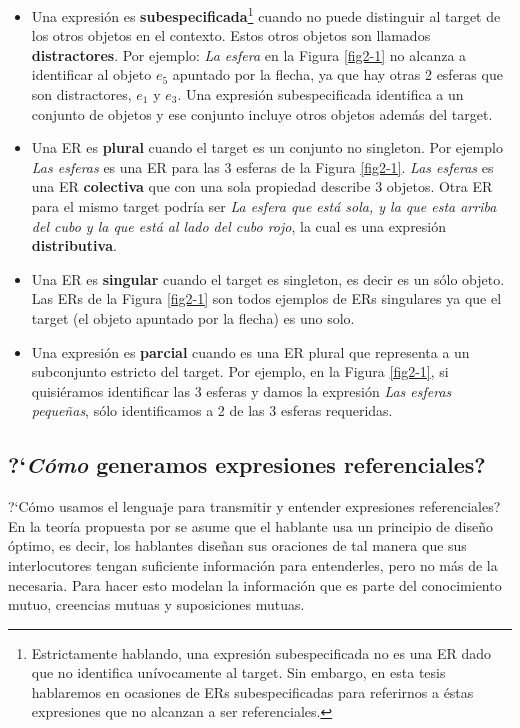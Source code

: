 \begin{itemize}
\item Una expresi\'on es {\bf subespecificada}\footnote{Estrictamente hablando, una expresi\'on subespecificada no es una ER dado que no identifica un\'ivocamente al target. Sin embargo, en esta tesis hablaremos en ocasiones de ERs subespecificadas para referirnos a \'estas expresiones que no alcanzan a ser referenciales.} cuando no puede distinguir al target de los otros objetos en el contexto. Estos otros objetos son llamados \textbf{distractores}. Por ejemplo: {\it La esfera} en la Figura \ref{fig2-1} no alcanza a identificar al objeto $e_5$ apuntado por la flecha, ya que hay otras 2 esferas que son distractores, $e_1$ y $e_3$. Una expresi\'on subespecificada identifica a un conjunto de objetos y ese conjunto incluye otros objetos adem\'as del target.

\item Una ER es {\bf plural} cuando el target es un conjunto no singleton. Por ejemplo {\it Las esferas} es una ER para las 3 esferas de la Figura \ref{fig2-1}. {\it Las esferas} es una ER \textbf{colectiva} que con una sola propiedad describe 3 objetos. Otra ER para el mismo target podr\'ia ser {\it La esfera que est\'a sola, y la que esta arriba del cubo y la que est\'a al lado del cubo rojo}, la cual es una expresi\'on \textbf{distributiva}.

\item Una ER es {\bf singular} cuando el target es singleton, es decir es un s\'olo objeto. Las ERs de la Figura \ref{fig2-1} son todos ejemplos de ERs singulares ya que el target (el objeto apuntado por la flecha) es uno solo. 

\item Una expresi\'on es {\bf parcial} cuando es una ER plural que representa a un subconjunto estricto del target. Por ejemplo, en la Figura \ref{fig2-1}, si quisi\'eramos identificar las 3 esferas y damos la expresi\'on {\it Las esferas peque\~nas}, s\'olo identificamos a 2 de las 3 esferas requeridas.
\end{itemize}

\subsection{?`\emph{C\'omo} generamos expresiones referenciales?}
\label{sec:psicolinguistica}

?`C\'omo usamos el lenguaje para transmitir y entender expresiones referenciales? En la teor\'ia propuesta por \cite{clark1992arenas,clark96} se asume que el hablante usa un principio de dise\~no \'optimo, es decir, los hablantes dise\~nan sus oraciones de tal manera que sus interlocutores tengan suficiente informaci\'on para entenderles, pero no m\'as de la necesaria. Para hacer esto modelan la informaci\'on que es parte del conocimiento mutuo, creencias mutuas y suposiciones mutuas. 

